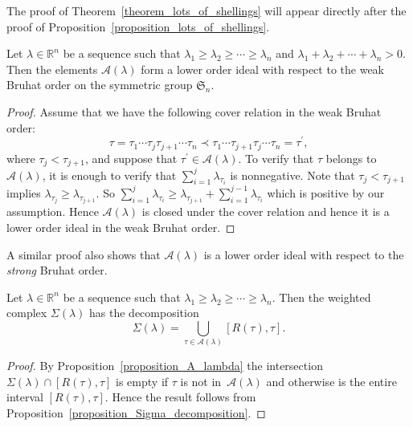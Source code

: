 \documentclass[ALCO,ThmDefs,Unicode,epreuves]{cedram}
\newcommand{\Rrr}{\mathbb{R}}
\newcommand{\Sym}{\mathfrak{S}}
\newcommand{\coveredby}{\prec}
\newcommand{\lambdaweaklydecreasing}
{\lambda_{1} \geq \lambda_{2} \geq \cdots \geq \lambda_{n}}
\newcommand{\lambdasumpositive}
{\lambda_{1} + \lambda_{2} + \cdots + \lambda_{n} > 0}
\begin{document}
The proof of Theorem~\ref{theorem_lots_of_shellings}
will appear directly
after the proof of Proposition~\ref{proposition_lots_of_shellings}.



\begin{prop}
Let $\lambda \in \Rrr^{n}$ be a sequence such that
$\lambdaweaklydecreasing$ and
$\lambdasumpositive$.
Then the elements $\mathcal{A}(\lambda)$
form a lower order ideal with respect to the weak Bruhat order
on the symmetric group $\Sym_{n}$.
\label{proposition_A_lambda}
\end{prop}
\begin{proof}
Assume that
we have the following cover relation in the
weak Bruhat order:
$$
\tau
= 
\tau_{1} \cdots \tau_{j} \tau_{j+1} \cdots \tau_{n}
\coveredby
\tau_{1} \cdots \tau_{j+1} \tau_{j} \cdots \tau_{n}=\tau^{\prime}, $$
where 
$\tau_{j} < \tau_{j+1}$, and suppose that $\tau^{\prime}\in\mathcal{A}(\lambda)$.
To verify that $\tau$ belongs to $\mathcal{A}(\lambda)$,
it is enough to verify that
$\sum_{i=1}^{j} \lambda_{\tau_{i}}$ is nonnegative.
Note that
$\tau_{j} < \tau_{j+1}$
implies
$\lambda_{\tau_{j}} \geq \lambda_{\tau_{j+1}}$.
So
$\sum_{i=1}^{j} \lambda_{\tau_{i}}
\geq
\lambda_{\tau_{j+1}}
+
\sum_{i=1}^{j-1} \lambda_{\tau_{i}}$
which is positive by our assumption.
Hence
$\mathcal{A}(\lambda)$ is closed under the cover relation and
hence it is a lower order ideal in the weak Bruhat order.
\end{proof}

\begin{remark}
{\rm
A similar proof also shows that $\mathcal{A}(\lambda)$ is a
lower order ideal with respect to the \emph{strong} Bruhat order.
}
\end{remark}

\begin{prop}
Let $\lambda \in \Rrr^{n}$ be a sequence such that
$\lambdaweaklydecreasing$.
Then the weighted complex $\Sigma(\lambda)$
has the decomposition
$$ \Sigma(\lambda) = \bigcup_{\tau \in \mathcal{A}(\lambda)} [R(\tau), \tau] . $$
\label{proposition_Sigma_lambda_decomposition}
\end{prop}
\begin{proof}
By Proposition~\ref{proposition_A_lambda}
the intersection $\Sigma(\lambda) \cap [R(\tau),\tau]$
is empty if $\tau$ is not in~$\mathcal{A}(\lambda)$
and otherwise is the entire interval $[R(\tau), \tau]$.
Hence the result follows from
Proposition~\ref{proposition_Sigma_decomposition}.
\end{proof}
\end{document}
